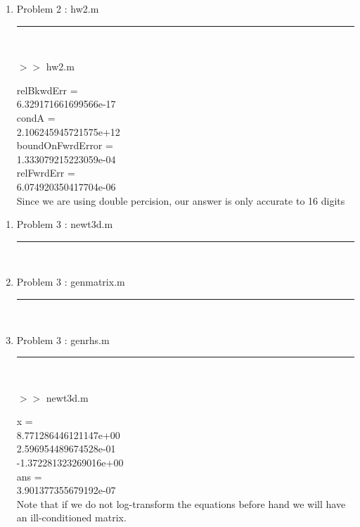 \documentclass[12pt]{article}
\newcommand*\lstinputpath[1]{\lstset{inputpath=#1}}
\begin{document}
\pagebreak	
	
	\begin{enumerate}
	
	\item[] Problem 2 : hw2.m \noindent\rule{\textwidth}{1.0pt} \\
	\lstinputpath{P2}
		
	
	\pagebreak	
	
	$>>$ hw2.m
	\begin{framed}
relBkwdErr =\\
     6.329171661699566e-17\\

condA =\\
     2.106245945721575e+12\\


boundOnFwrdError =\\
     1.333079215223059e-04\\


relFwrdErr =\\
     6.074920350417704e-06\\

Since we are using double percision, our answer is only accurate to 16 digits
	\end{framed}
	
	\end{enumerate}
	
\pagebreak	
	
	\begin{enumerate}
	
	\item[] Problem 3 : newt3d.m \noindent\rule{\textwidth}{1.0pt} \\
	\lstinputpath{P3}
		
	
	\item[] Problem 3 : genmatrix.m \noindent\rule{\textwidth}{1.0pt} \\
		
	
	\item[] Problem 3 : genrhs.m \noindent\rule{\textwidth}{1.0pt} \\
		
	
	\pagebreak	
	
	$>>$ newt3d.m
	\begin{framed}
	x =\\
     8.771286446121147e+00\\
     2.596954489674528e-01\\
    -1.372281323269016e+00\\

ans =\\
     3.901377355679192e-07 \\ 
     
     Note that if we do not log-transform the equations before hand we will have an ill-conditioned matrix.
	\end{framed}
	
	\end{enumerate}
	
\end{document}
